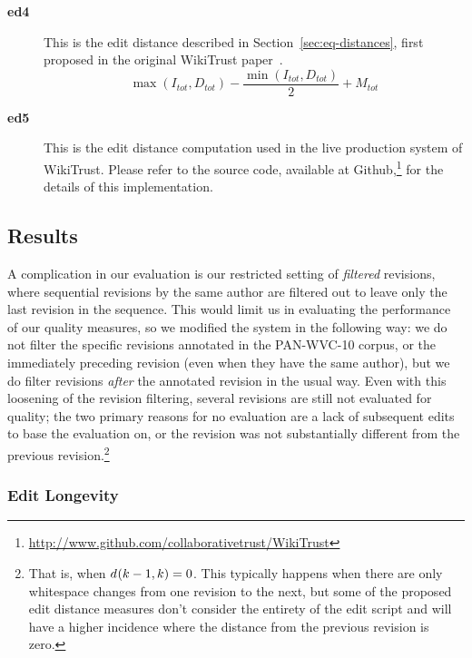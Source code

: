 \begin{description}
\item[\textbf{ed4}] This is the edit distance described in
    Section~\ref{sec:eq-distances}, first proposed in
    the original WikiTrust paper~\cite{Adler2007}.
    \begin{equation*}
    \max(I_{tot}, D_{tot}) - \frac{\min(I_{tot}, D_{tot})}{2}
		+ M_{tot}
    \end{equation*}

\item[\textbf{ed5}] This is the edit distance computation used
    in the live production system of WikiTrust.
    Please refer to the source code, available at
    Github,\footnote{\url{http://www.github.com/collaborativetrust/WikiTrust}}
    for the details of this implementation.

\end{description}

\subsection{Results}

A complication in our evaluation is our restricted setting of
\textit{filtered} revisions, where sequential revisions by the
same author are filtered out to leave only the last revision
in the sequence.
This would limit us in evaluating the performance of our
quality measures, so we modified the system in the following way:
we do not filter the specific revisions annotated in the PAN-WVC-10 corpus,
or the immediately preceding revision (even when they have the
same author), but we do filter revisions \textit{after} the annotated
revision in the usual way.
Even with this loosening of the revision filtering, several
revisions are still not evaluated for quality; the two
primary reasons for no evaluation are a lack of subsequent
edits to base the evaluation on, or the revision was not
substantially different from the previous
revision.\footnote{That is, when $d_{}(k-1,k) = 0$.
This typically happens when there are only whitespace changes
from one revision to the next, but some of the proposed edit distance
measures don't consider the entirety of the edit script and
will have a higher incidence where the distance from the
previous revision is zero.}

\subsubsection{Edit Longevity}


